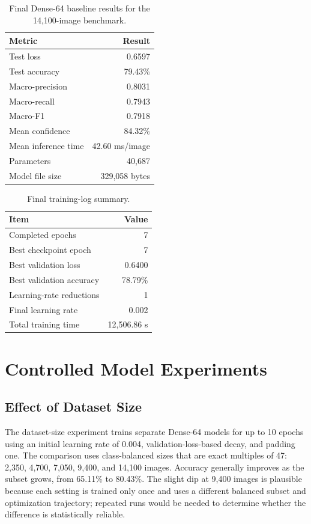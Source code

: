 \documentclass[a4paper,12pt]{extreport}
\begin{document}
\begin{table}[H]
\centering
\caption{Final Dense-64 baseline results for the 14,100-image benchmark.}
\label{tab:baseline-results}
\begin{tabular}{lr}
\toprule
Metric & Result \\
\midrule
Test loss & 0.6597 \\
Test accuracy & 79.43\% \\
Macro-precision & 0.8031 \\
Macro-recall & 0.7943 \\
Macro-F1 & 0.7918 \\
Mean confidence & 84.32\% \\
Mean inference time & 42.60 ms/image \\
Parameters & 40,687 \\
Model file size & 329,058 bytes \\
\bottomrule
\end{tabular}
\end{table}

\begin{table}[H]
\centering
\caption{Final training-log summary.}
\label{tab:training-summary}
\begin{tabular}{lr}
\toprule
Item & Value \\
\midrule
Completed epochs & 7 \\
Best checkpoint epoch & 7 \\
Best validation loss & 0.6400 \\
Best validation accuracy & 78.79\% \\
Learning-rate reductions & 1 \\
Final learning rate & 0.002 \\
Total training time & 12,506.86 s \\
\bottomrule
\end{tabular}
\end{table}

\section{Controlled Model Experiments}

\subsection*{Effect of Dataset Size}
The dataset-size experiment trains separate Dense-64 models for up to 10 epochs using an initial learning rate of 0.004, validation-loss-based decay, and padding one. The comparison uses class-balanced sizes that are exact multiples of 47: 2,350, 4,700, 7,050, 9,400, and 14,100 images. Accuracy generally improves as the subset grows, from 65.11\% to 80.43\%. The slight dip at 9,400 images is plausible because each setting is trained only once and uses a different balanced subset and optimization trajectory; repeated runs would be needed to determine whether the difference is statistically reliable.
\end{document}
